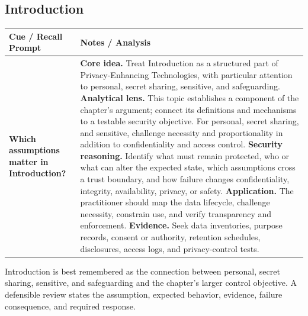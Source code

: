 \documentclass[11pt]{article}
\newcommand{\CornellHeader}{%
\rowcolor{Navy}\color{white}\bfseries Cue / Recall Prompt & \color{white}\bfseries Notes / Analysis\\\hline}
\newcommand{\CornellRow}[2]{%
\cellcolor{CueGray}\RaggedRight\textbf{#1} & \RaggedRight #2\\\hline}
\begin{document}
\subsection*{Introduction}
\begin{longtable}{>{\RaggedRight\arraybackslash}p{}|>{\RaggedRight\arraybackslash}p{}}
\CornellHeader
\CornellRow{Which assumptions matter in Introduction?}{\textbf{Core idea.} Treat Introduction as a structured part of Privacy-Enhancing Technologies, with particular attention to personal, secret sharing, sensitive, and safeguarding. \textbf{Analytical lens.} This topic establishes a component of the chapter's argument; connect its definitions and mechanisms to a testable security objective. For personal, secret sharing, and sensitive, challenge necessity and proportionality in addition to confidentiality and access control. \textbf{Security reasoning.} Identify what must remain protected, who or what can alter the expected state, which assumptions cross a trust boundary, and how failure changes confidentiality, integrity, availability, privacy, or safety. \textbf{Application.} The practitioner should map the data lifecycle, challenge necessity, constrain use, and verify transparency and enforcement. \textbf{Evidence.} Seek data inventories, purpose records, consent or authority, retention schedules, disclosures, access logs, and privacy-control tests.}
\end{longtable}
\begin{topicsummary}
Introduction is best remembered as the connection between personal, secret sharing, sensitive, and safeguarding and the chapter's larger control objective. A defensible review states the assumption, expected behavior, evidence, failure consequence, and required response.
\end{topicsummary}
\end{document}
